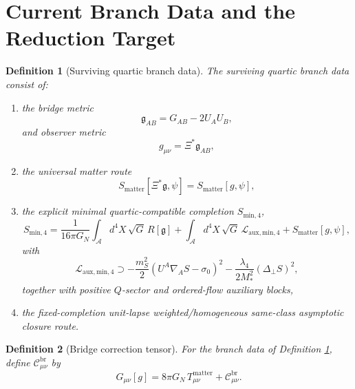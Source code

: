 \documentclass[11pt]{article}
\newcommand{\Sub}{\mathcal{A}}
\newcommand{\BridgeMetric}{\mathfrak{g}}
\newtheorem{definition}{Definition}
\begin{document}
\section{Current Branch Data and the Reduction Target}

\begin{definition}[Surviving quartic branch data]
\label{def:branch}
The \emph{surviving quartic branch data} consist of:
\begin{enumerate}
    \item the bridge metric
    \begin{equation}
    \BridgeMetric_{AB}=G_{AB}-2U_AU_B,
    \label{eq:bridge}
    \end{equation}
    and observer metric
    \begin{equation}
    g_{\mu\nu}=\Xi^\ast\BridgeMetric_{AB},
    \label{eq:obsmetric}
    \end{equation}
    \item the universal matter route
    \begin{equation}
    S_{\mathrm{matter}}[\Xi^\ast\BridgeMetric,\psi]
    =
    S_{\mathrm{matter}}[g,\psi],
    \label{eq:matterroute}
    \end{equation}
    \item the explicit minimal quartic-compatible completion \(S_{\mathrm{min},4}\),
    \begin{equation}
    S_{\mathrm{min},4}
    =
    \frac{1}{16\pi G_N}
    \int_{\Sub} d^4X\,\sqrt{G}\,R[\BridgeMetric]
    + \int_{\Sub} d^4X\,\sqrt{G}\,\mathcal L_{\mathrm{aux,min},4}
    + S_{\mathrm{matter}}[g,\psi],
    \label{eq:Smin4}
    \end{equation}
    with
    \begin{equation}
    \mathcal L_{\mathrm{aux,min},4}
    \supset
    -\frac{m_S^2}{2}(U^A\nabla_A S-\sigma_0)^2
    -\frac{\lambda_4}{2M_*^2}(\Delta_\perp S)^2,
    \label{eq:quarticpiece}
    \end{equation}
    together with positive \(Q\)-sector and ordered-flow auxiliary blocks,
    \item the fixed-completion unit-lapse weighted/homogeneous same-class asymptotic closure route.
\end{enumerate}
\end{definition}

\begin{definition}[Bridge correction tensor]
\label{def:C}
For the branch data of Definition \ref{def:branch}, define \(\mathcal C_{\mu\nu}^{\mathrm{br}}\) by
\begin{equation}
G_{\mu\nu}[g]
=
8\pi G_N\,T_{\mu\nu}^{\mathrm{matter}}
+ \mathcal C_{\mu\nu}^{\mathrm{br}}.
\label{eq:bridgeeq}
\end{equation}
\end{definition}
\end{document}
